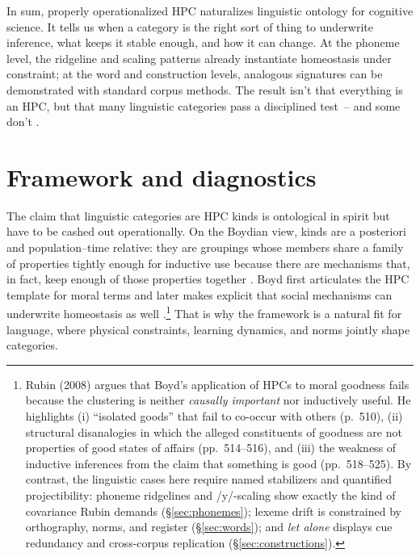 \documentclass[12pt]{article}
\begin{document}
In sum, properly operationalized HPC naturalizes linguistic ontology for cognitive science. It tells us when a category is the right sort of thing to underwrite inference, what keeps it stable enough, and how it can change. At the phoneme level, the ridgeline and scaling patterns already instantiate homeostasis under constraint; at the word and construction levels, analogous signatures can be demonstrated with standard corpus methods. The result isn't that everything is an HPC, but that many linguistic categories pass a disciplined test~-- and some don't \citep{Miller2021WordsSpeciesKinds,Ekstrom2025PhonemeTool}.

\section{Framework and diagnostics}\label{sec:framework}

The claim that linguistic categories are HPC kinds is ontological in spirit but have to be cashed out operationally. On the Boydian view, kinds are a posteriori and population–time relative: they are groupings whose members share a family of properties tightly enough for inductive use because there are mechanisms that, in fact, keep enough of those properties together \citep{Boyd1991Enthusiasm,Boyd1999Homeostasis}. Boyd first articulates the \textsc{HPC} template for moral terms \citep[§3.8]{Boyd1988MoralRealist} and later makes explicit that social mechanisms can underwrite homeostasis as well \citep{Boyd2000Workmanship}.\footnote{Rubin (2008) argues that Boyd's application of HPCs to  moral goodness fails because the clustering is neither \emph{causally important}  nor inductively useful. He highlights (i) ``isolated goods'' that fail to  co-occur with others (p.~510), (ii) structural disanalogies in which the  alleged constituents of goodness are not properties of good states of affairs  (pp.~514--516), and (iii) the weakness of inductive inferences from the claim  that something is good (pp.~518--525). By contrast, the linguistic cases here  require named stabilizers and quantified projectibility: phoneme ridgelines  and /y/-scaling show exactly the kind of covariance Rubin demands 
(\S\ref{sec:phonemes}); lexeme drift is constrained by orthography, norms, and  register (\S\ref{sec:words}); and \emph{let alone} displays cue redundancy and cross-corpus replication (\S\ref{sec:constructions}).} That is why the framework is a natural fit for language, where physical constraints, learning dynamics, and norms jointly shape categories.
\end{document}
